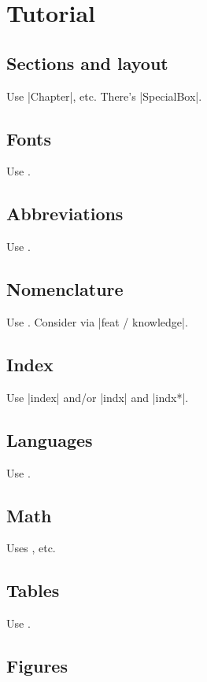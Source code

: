 \chapter{Tutorial}

\section {Sections and layout}

Use \term|Chapter|, etc.
There's \term|SpecialBox|.


\section {Fonts}

Use .


\section {Abbreviations}

Use .


\section {Nomenclature}

Use .
Consider  via \term|feat / knowledge|.


\section {Index}
Use \term|index| and/or \term|indx| and \term|indx*|.


\section {Languages}

Use .


\section {Math}

Uses , etc.


\section {Tables}

Use .


\section {Figures}

